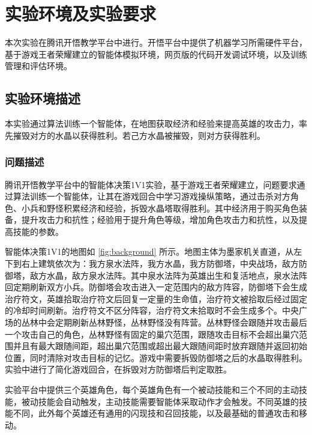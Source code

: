 \section{实验环境及实验要求}
本次实验在腾讯开悟教学平台中进行。开悟平台中提供了机器学习所需硬件平台，基于游戏王者荣耀建立的智能体模拟环境，网页版的代码开发调试环境，以及训练管理和评估环境。

\subsection{实验环境描述}
本实验通过算法训练一个智能体，在地图获取经济和经验来提高英雄的攻击力，率先摧毁对方的水晶以获得胜利。若己方水晶被摧毁，则对方获得胜利。

\subsubsection{问题描述}
腾讯开悟教学平台中的智能体决策1V1实验，基于游戏王者荣耀建立，问题要求通过算法训练一个智能体，让其在游戏回合中学习游戏操纵策略，通过击杀对方角色、小兵和野怪积累经济和经验，拆毁水晶塔取得胜利。其中经济用于购买角色装备，提升攻击力和抗性；经验用于提升角色等级，增加角色攻击力和抗性，以及提高技能的参数。


智能体决策1V1的地图如 \cref{fig:background} 所示。地图主体为墨家机关直道，从左下到右上建筑依次为：我方泉水法阵，我方水晶，我方防御塔，中央战场，敌方防御塔，敌方水晶，敌方泉水法阵。其中泉水法阵为英雄出生和复活地点，泉水法阵回定期刷新双方小兵。防御塔会攻击进入一定范围内的敌方阵容，防御塔下会生成治疗符文，英雄拾取治疗符文后回复一定量的生命值，治疗符文被拾取后经过固定的冷却时间刷新。治疗符文不区分阵容，治疗符文未拾取时不会生成多个。中央广场的丛林中会定期刷新丛林野怪，丛林野怪没有阵营。丛林野怪会跟随并攻击最后一个攻击自己的角色，丛林野怪有固定的巢穴范围，跟随攻击目标不会超出巢穴范围并且有最大跟随间距，超出巢穴范围或超出最大跟随间距时放弃跟随并返回初始位置，同时清除对攻击目标的记忆。游戏中需要拆毁防御塔之后的水晶取得胜利。实验中进行了简化游戏回合，在拆毁对方防御塔后判定取胜。


实验平台中提供三个英雄角色，每个英雄角色有一个被动技能和三个不同的主动技能，被动技能会自动触发，主动技能需要智能体采取动作才会触发。不同英雄的技能不同，此外每个英雄还有通用的闪现技和召回技能，以及最基础的普通攻击和移动。

